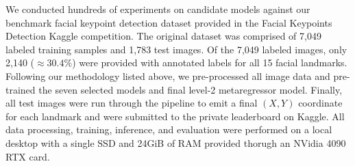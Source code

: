 We conducted hundreds of experiments on candidate models against our benchmark facial keypoint detection dataset provided in the Facial Keypoints Detection Kaggle competition.  The original dataset was comprised of 7,049 labeled training samples and 1,783 test images.  Of the 7,049 labeled images, only 2,140 ($\approx 30.4\%$) were provided with annotated labels for all 15 facial landmarks.  Following our methodology listed above, we pre-processed all image data and pre-trained the seven selected models and final level-2 metaregressor model.  Finally, all test images were run through the pipeline to emit a final $(X,Y)$ coordinate for each landmark and were submitted to the private leaderboard on Kaggle.  All data processing, training, inference, and evaluation were performed on a local desktop with a single SSD and 24GiB of RAM provided thorugh an NVidia 4090 RTX card.

